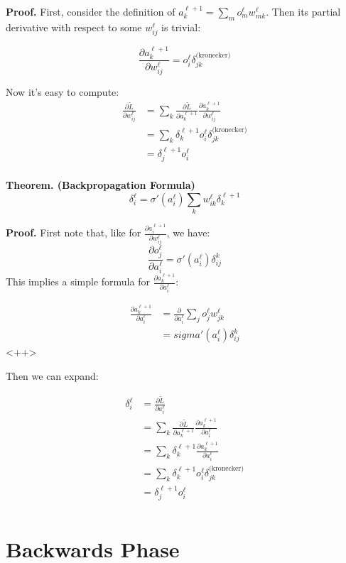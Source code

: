 \documentclass[letterpaper]{article}
\begin{document}
{\bf Proof.} First, consider the definition of $a_k^{\ell+1}=\sum_m o_m^\ell w_{mk}^\ell$. 
Then its partial derivative with respect to some $w_{ij}^\ell$ is trivial:

$$\frac{\partial a_k^{\ell+1}}{\partial w_{ij}^\ell}=o_i^\ell \delta_{jk}^{\text{(kronecker)}}$$

Now it's easy to compute:
\begin{align*}
    \frac{\partial \tilde L}{\partial  w_{ij}^\ell}&=\sum_k\frac{\partial \tilde L}{\partial a_k^{\ell+1}}\frac{\partial a_k^{\ell+1}}{\partial w_{ij}^\ell}\\
    &=\sum_k\delta_k^{\ell+1} o_i^\ell \delta_{jk}^{\text{(kronecker)}}\\
    &=\delta_j^{\ell+1} o_i^\ell \\
\end{align*}

{\bf Theorem. (Backpropagation Formula)} $$\delta_i^\ell=\sigma'(a_i^\ell)\sum_k w_{ik}^\ell \delta_k^{\ell+1}$$

{\bf Proof.} First note that, like for $\frac{\partial a_i^{\ell+1}}{\partial w_{ij}^\ell}$, we have:
$$\frac{\partial o_j^\ell}{\partial a_i^\ell}=\sigma'(a_i^\ell) \delta_{ij}^k$$
This implies a simple formula for $\frac{\partial a_k^{\ell+1}}{\partial a_i^\ell}$: 

\begin{align*}
    \frac{\partial a_k^{\ell+1}}{\partial a_i^\ell}&=\frac{\partial}{\partial a_i^\ell}\sum_j o_j^{\ell} w_{jk}^{\ell} \\
    &=sigma'(a_i^\ell) \delta_{ij}^k
\end{align*}<++>

$$$$
Then we can expand:

\begin{align*}
    \delta_i^\ell&=\frac{\partial \tilde L}{\partial  a_i^\ell}\\
    &=\sum_k\frac{\partial \tilde L}{\partial a_k^{\ell+1}}\frac{\partial a_k^{\ell+1}}{\partial a_{i}^\ell}\\
    &=\sum_k\delta_k^{\ell+1}\frac{\partial a_k^{\ell+1}}{\partial a_{i}^\ell}\\
    &=\sum_k\delta_k^{\ell+1} o_i^\ell \delta_{jk}^{\text{(kronecker)}}\\
    &=\delta_j^{\ell+1} o_i^\ell \\
\end{align*}




\section{Backwards Phase}
\end{document}
